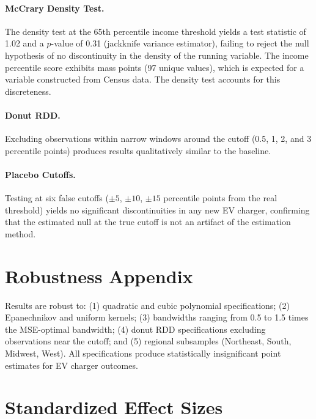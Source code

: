 \documentclass[12pt]{article}
\begin{document}
\paragraph{McCrary Density Test.} The \citet{cattaneo2020density} density test at the 65th percentile income threshold yields a test statistic of 1.02 and a $p$-value of 0.31 (jackknife variance estimator), failing to reject the null hypothesis of no discontinuity in the density of the running variable. The income percentile score exhibits mass points (97 unique values), which is expected for a variable constructed from Census data. The density test accounts for this discreteness.

\paragraph{Donut RDD.} Excluding observations within narrow windows around the cutoff (0.5, 1, 2, and 3 percentile points) produces results qualitatively similar to the baseline.

\paragraph{Placebo Cutoffs.} Testing at six false cutoffs ($\pm 5$, $\pm 10$, $\pm 15$ percentile points from the real threshold) yields no significant discontinuities in any new EV charger, confirming that the estimated null at the true cutoff is not an artifact of the estimation method.

\section{Robustness Appendix}

Results are robust to: (1) quadratic and cubic polynomial specifications; (2) Epanechnikov and uniform kernels; (3) bandwidths ranging from 0.5 to 1.5 times the MSE-optimal bandwidth; (4) donut RDD specifications excluding observations near the cutoff; and (5) regional subsamples (Northeast, South, Midwest, West). All specifications produce statistically insignificant point estimates for EV charger outcomes.

\section{Standardized Effect Sizes}
\label{sec:sde}


\end{document}
